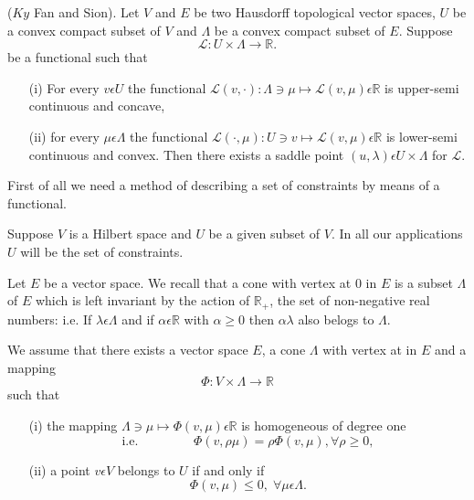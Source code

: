 \begin{theorem}\label{chap5-thm1.2}
($Ky$ Fan and Sion). Let $V$ and $E$ be two Hausdorff topological vector spaces, $U$ be a convex compact subset of $V$ and $\Lambda$ be a convex compact subset of $E$. Suppose
$$
\mathscr{L} : U \times \Lambda \to \mathbb{R}.
$$
be a functional such that
\begin{enumerate}
\item[(i)] For every $v \epsilon U$ the functional $\mathscr{L} (v, \cdot) : \Lambda \ni \mu \mapsto \mathscr{L} (v, \mu) \epsilon \mathbb{R}$ is upper-semi continuous and concave,

\item[(ii)] for every $\mu \epsilon \Lambda$ the functional $\mathscr{L} (\cdot , \mu) : U \ni v \mapsto \mathscr{L} (v, \mu) \epsilon \mathbb{R}$ is lower-semi continuous and convex. Then there exists a saddle point $(u, \lambda) \epsilon U \times \Lambda$ for $\mathscr{L}$.
\end{enumerate}
\end{theorem}

\medskip
{}

First of all we need a method of describing a set of constraints by means of a functional.

Suppose $V$ is a Hilbert space and $U$ be a given subset of $V$. In all our applications $U$ will be the set of constraints.

Let $E$ be a vector space. We recall that a cone with vertex at 0 in $E$ is a subset $\Lambda$ of $E$ which is left invariant by the action of $\mathbb{R}_{+}$, the set of non-negative real numbers: i.e. If $\lambda \epsilon \Lambda$ and if $\alpha \epsilon \mathbb{R}$ with $\alpha \geq 0$ then $\alpha \lambda$ also belogs to $\Lambda$.

We assume that there exists a vector space $E$, a cone $\Lambda$ with vertex at in $E$ and a mapping
$$
\Phi : V \times \Lambda \to \mathbb{R}
$$
such that
\begin{enumerate}
\item[(i)] the mapping $\Lambda \ni \mu \mapsto \Phi (v, \mu) \epsilon \mathbb{R}$ is homogeneous of degree one 
$$
\text{i.e. }\qquad\qquad \Phi(v, \rho \mu) = \rho \Phi (v, \mu), \forall \rho \geq 0,
$$
\item[(ii)] a point $v \epsilon V$ belongs to $U$ if and only if
$$
\Phi (v, \mu) \leq 0, \; \forall \mu \epsilon \Lambda.
$$
\end{enumerate}

